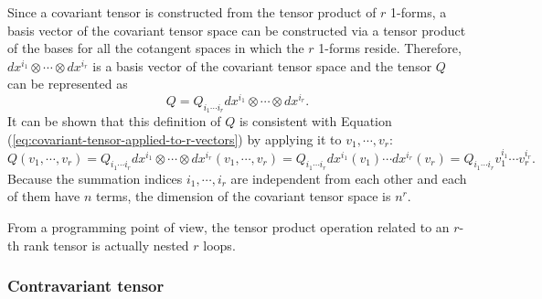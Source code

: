 \documentclass[11pt, a4paper]{book}
\begin{document}
Since a covariant tensor is constructed from the tensor product of $r$ 1-forms, a basis
vector of the covariant tensor space can be constructed via a tensor product of the bases
for all the cotangent spaces in which the $r$ 1-forms reside. Therefore,
$dx^{i_1}\otimes\cdots\otimes dx^{i_r}$ is a basis vector of the covariant tensor space
and the tensor $Q$ can be represented as
\begin{equation}
  \label{eq:covariant-tensor-expanded-as-tensor-product}
  Q = Q_{i_1\cdots i_r} dx^{i_1}\otimes\cdots\otimes dx^{i_r}.
\end{equation}
It can be shown that this definition of $Q$ is consistent with Equation
(\ref{eq:covariant-tensor-applied-to-r-vectors}) by applying it to $v_1,\cdots,v_r$:
\begin{equation}
  Q(v_1,\cdots,v_r) = Q_{i_1\cdots i_r} dx^{i_1}\otimes\cdots\otimes
  dx^{i_r}(v_1,\cdots,v_r) = Q_{i_1\cdots i_r} dx^{i_1}(v_1)\cdots dx^{i_r}(v_r) =
  Q_{i_1\cdots i_r} v_1^{i_1}\cdots v_r^{i_r}.
\end{equation}
Because the summation indices $i_1,\cdots,i_r$ are independent from each other and each of
them have $n$ terms, the dimension of the covariant tensor space is $n^r$.

\begin{Remark}
  From a programming point of view, the tensor product operation related to an $r$-th rank
  tensor is actually nested $r$ loops.
  \begin{breakablealgorithm}
  \begin{algorithmic}[1]
        \State {$\cdots$}
        \EndFor
      \EndFor
    \EndFor
  \end{algorithmic}
  \end{breakablealgorithm}
\end{Remark}

\subsubsection{Contravariant tensor}
\end{document}

